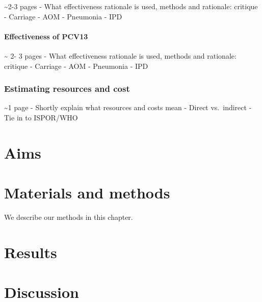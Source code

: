 \documentclass[]{book}
\theoremstyle{definition}
\theoremstyle{definition}
\theoremstyle{definition}
\theoremstyle{remark}
\begin{document}
\textasciitilde{}2-3 pages - What effectiveness rationale is used,
methods and rationale: critique - Carriage - AOM - Pneumonia - IPD

\subsubsection{Effectiveness of PCV13}\label{effectiveness-of-pcv13}

\textasciitilde{} 2- 3 pages - What effectiveness rationale is used,
methods and rationale: critique - Carriage - AOM - Pneumonia - IPD

\subsection{Estimating resources and
cost}\label{estimating-resources-and-cost}

\textasciitilde{}1 page - Shortly explain what resources and costs mean
- Direct vs.~indirect - Tie in to ISPOR/WHO

\chapter{Aims}\label{aims}

\chapter{Materials and methods}\label{methods}

We describe our methods in this chapter.

\chapter{Results}\label{results}

\chapter{Discussion}\label{discussion}


\end{document}
